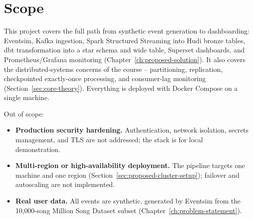 \section{Scope}

This project covers the full path from synthetic event generation to dashboarding: Eventsim, Kafka ingestion, Spark Structured Streaming into Hudi bronze tables, dbt transformation into a star schema and wide table, Superset dashboards, and Prometheus/Grafana monitoring (Chapter~\ref{ch:proposed-solution}). It also covers the distributed-systems concerns of the course -- partitioning, replication, checkpointed exactly-once processing, and consumer-lag monitoring (Section~\ref{sec:core-theory}). Everything is deployed with Docker Compose on a single machine.

Out of scope:

\begin{itemize}
    \item \textbf{Production security hardening.} Authentication, network isolation, secrets management, and TLS are not addressed; the stack is for local demonstration.
    \item \textbf{Multi-region or high-availability deployment.} The pipeline targets one machine and one region (Section~\ref{sec:proposed-cluster-setup}); failover and autoscaling are not implemented.
    \item \textbf{Real user data.} All events are synthetic, generated by Eventsim from the 10,000-song Million Song Dataset subset (Chapter~\ref{ch:problem-statement}).
\end{itemize}
